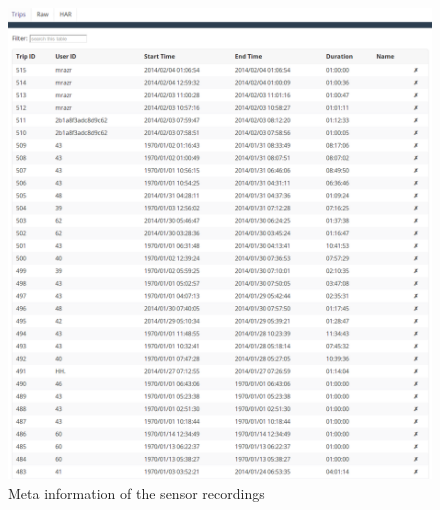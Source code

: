 \begin{figure}[ht]
  \begin{minipage}[b]{0.45\linewidth}
    \includegraphics[width=0.9 \textwidth]{img/sc/inspection_table.png}
    \caption{Meta information of the sensor recordings}\label{fig:minipage1}
  \end{minipage}\quad
  \begin{minipage}[b]{0.45\linewidth}

\end{minipage}
\end{figure}
